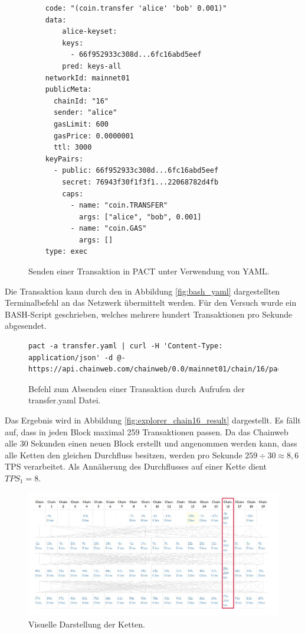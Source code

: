 \begin{figure}[h!]
\centering
{}
\begin{verbatim}
    code: "(coin.transfer 'alice' 'bob' 0.001)"
    data:
        alice-keyset:
        keys:
          - 66f952933c308d...6fc16abd5eef
        pred: keys-all
    networkId: mainnet01
    publicMeta:
      chainId: "16"
      sender: "alice"
      gasLimit: 600
      gasPrice: 0.0000001
      ttl: 3000
    keyPairs:
      - public: 66f952933c308d...6fc16abd5eef
        secret: 76943f30f1f3f1...22068782d4fb
        caps: 
          - name: "coin.TRANSFER"
            args: ["alice", "bob", 0.001]
          - name: "coin.GAS"
            args: []
    type: exec
  \end{verbatim}
    \caption{Senden einer Transaktion in PACT unter Verwendung von YAML.} 
    \label{fig:coin_transfer_example}
\end{figure}

Die Transaktion kann durch den in Abbildung \eqref{fig:bash_yaml} dargestellten Terminalbefehl an das Netzwerk übermittelt werden. Für den Versuch wurde ein BASH-Script geschrieben, welches mehrere hundert Transaktionen pro Sekunde abgesendet.

\begin{figure}[h!]
    \begin{lstlisting}[breaklines]
pact -a transfer.yaml | curl -H 'Content-Type: application/json' -d @- https://api.chainweb.com/chainweb/0.0/mainnet01/chain/16/pact/api/v1/send
    \end{lstlisting}
    \caption{Befehl zum Absenden einer Transaktion durch Aufrufen der transfer.yaml Datei.}
    \label{fig:bash_yaml}
\end{figure}

Das Ergebnis wird in Abbildung \eqref{fig:explorer_chain16_result} dargestellt. Es fällt auf, dass in jeden Block maximal 259 Transaktionen passen. Da das Chainweb alle 30 Sekunden einen neuen Block erstellt und angenommen werden kann, dass alle Ketten den gleichen Durchfluss besitzen, werden pro Sekunde $259 \div 30  \approx 8,6$ TPS verarbeitet. Als Annäherung des Durchflusses auf einer Kette dient $TPS_1 = 8$.

\begin{figure}[h!]
	\centering
	\includegraphics[width=1\linewidth]{images/explorer_crop.pdf}
	\caption{Visuelle Darstellung der Ketten. \cite{KadenaLCC.}} 
	\label{fig:explorer_chain16_result}
\end{figure}

